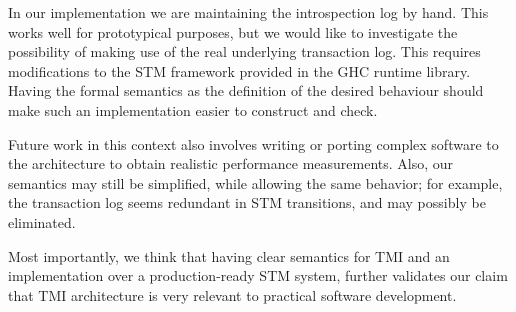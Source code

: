 In our implementation we are maintaining the introspection log by hand. This works well for
prototypical purposes, but we would like to investigate the possibility of making use
of the real underlying transaction log. This requires modifications to the STM framework
provided in the GHC runtime library. Having the formal semantics as the definition of the desired
behaviour should make such an implementation easier to construct and check.

Future work in this context also involves writing or porting complex software to the
architecture to obtain realistic performance measurements.
Also, our semantics may still be simplified, while allowing the same behavior; 
for example, the transaction log seems redundant in STM transitions, 
and may possibly be eliminated.


Most importantly, we think that having clear semantics for TMI and an implementation
over a production-ready STM system, further validates our claim that TMI architecture
is very relevant to practical software development.
